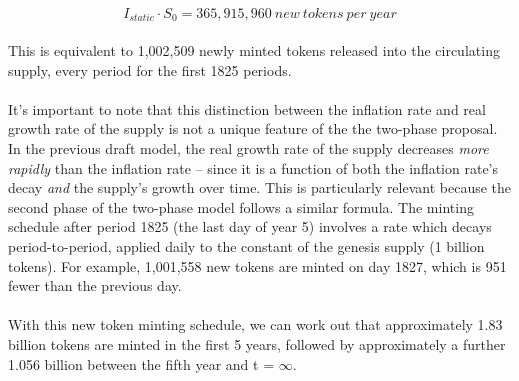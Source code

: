 \documentclass[8pt]{article}
\begin{document}
\begin{equation}
   I_{static} \cdot S_0 = 365,915,960\:new \:tokens \:per \:year
\end{equation}
\\
This is equivalent to 1,002,509 newly minted tokens released into the circulating supply, every period for the first 1825 periods. 
\\\\
It's important to note that this distinction between the inflation rate and real growth rate of the supply is not a unique feature of the the two-phase proposal. In the previous draft model, the real growth rate of the supply decreases \textit{more rapidly} than the inflation rate – since it is a function of both the inflation rate's decay \textit{and} the supply's growth over time. This is particularly relevant because the second phase of the two-phase model follows a similar formula. The minting schedule after period 1825 (the last day of year 5) involves a rate which decays period-to-period, applied daily to the constant of the genesis supply (1 billion tokens). For example, 1,001,558 new tokens are minted on day 1827, which is 951 fewer than the previous day.
\\\\
With this new token minting schedule, we can work out that approximately 1.83 billion tokens are minted in the first 5 years, followed by approximately a further 1.056 billion between the fifth year and t = $\infty$.
\end{document}
